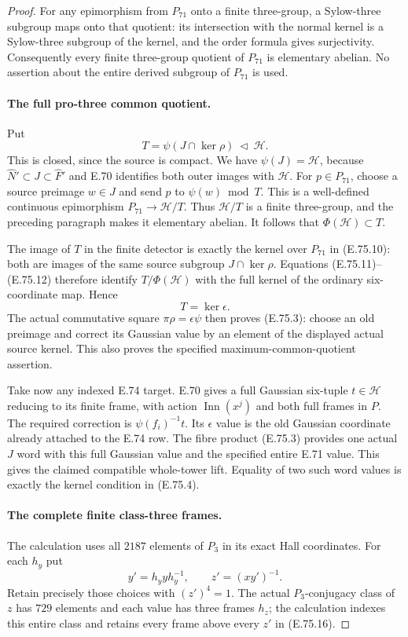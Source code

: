 \begin{proof}
For any epimorphism from $P_{71}$ onto a finite
three-group, a Sylow-three subgroup maps onto that
quotient: its intersection with the normal kernel
is a Sylow-three subgroup of the kernel, and the
order formula gives surjectivity. Consequently
every finite three-group quotient of $P_{71}$ is
elementary abelian. No assertion about the entire
derived subgroup of $P_{71}$ is used.

\paragraph{The full pro-three common quotient.}
Put
\[
       T=\psi(J\cap\ker\rho)\ \triangleleft\ \mathcal H.
 \tag{E.75.14}
\]
This is closed, since the source is compact. We have
$\psi(J)=\mathcal H$, because
$\widehat N'\subset J\subset\widehat F'$ and E.70
identifies both outer images with $\mathcal H$.
For $p\in P_{71}$, choose a source preimage $w\in J$
and send $p$ to $\psi(w)\bmod T$. This is a well-defined
continuous epimorphism
$P_{71}\to\mathcal H/T$. Thus $\mathcal H/T$ is a
finite three-group, and the preceding paragraph makes
it elementary abelian. It follows that
$\Phi(\mathcal H)\subset T$.

The image of $T$ in the finite detector is exactly
the kernel over $P_{71}$ in (E.75.10): both are
images of the same source subgroup $J\cap\ker\rho$.
Equations (E.75.11)--(E.75.12) therefore identify
$T/\Phi(\mathcal H)$ with the full kernel of the
ordinary six-coordinate map. Hence
\[
                       T=\ker\epsilon.
 \tag{E.75.15}
\]
The actual commutative square $\pi\rho=\epsilon\psi$
then proves (E.75.3): choose an old preimage and
correct its Gaussian value by an element of the
displayed actual source kernel. This also proves
the specified maximum-common-quotient assertion.

Take now any indexed E.74 target. E.70 gives a
full Gaussian six-tuple $t\in\mathcal H$ reducing
to its finite frame, with action
$\operatorname{Inn}(x^j)$ and both full frames in
$P$. The required correction is
$\psi(f_i)^{-1}t$. Its $\epsilon$ value is the old
Gaussian coordinate already attached to the E.74
row. The fibre product (E.75.3) provides one actual
$J$ word with this full Gaussian value and the
specified entire E.71 value. This gives the claimed
compatible whole-tower lift. Equality of two such
word values is exactly the kernel condition in
(E.75.4).

\paragraph{The complete finite class-three frames.}
The calculation uses all $2187$ elements of $P_3$
in its exact Hall coordinates. For each $h_y$ put
\[
       y'=h_yyh_y^{-1},\qquad z'=(xy')^{-1}.
 \tag{E.75.16}
\]
Retain precisely those choices with $(z')^4=1$.
The actual $P_3$-conjugacy class of $z$ has $729$
elements and each value has three frames $h_z$;
the calculation indexes this entire class and
retains every frame above every $z'$ in (E.75.16).


\end{proof}
